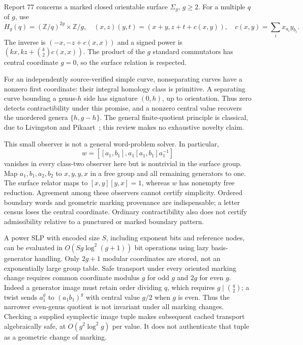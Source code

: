 Report 77 concerns a marked closed orientable surface $\Sigma_g$, $g\ge2$.
For a multiple $q$ of $g$, use
\[
 H_g(q)=(\mathbb Z/q)^{2g}\times\mathbb Z/g,\quad
 (x,z)(y,t)=(x+y,z+t+c(x,y)),\quad
 c(x,y)=\sum_i x_{a_i}y_{b_i}.
\]
The inverse is $(-x,-z+c(x,x))$ and a signed power is
$(kx,kz+\binom{k}{2}c(x,x))$. The product of the $g$ standard commutators
has central coordinate $g=0$, so the surface relation is respected.

For an independently source-verified simple curve, nonseparating curves
have a nonzero first coordinate: their integral homology class is primitive.
A separating curve bounding a genus-$h$ side has signature $(0,h)$, up to
orientation. Thus zero detects contractibility under this promise, and a
nonzero central value recovers the unordered genera $\{h,g-h\}$.
The general finite-quotient principle is classical, due to
Livingston and Pikaart~\cite{livingston-boundary,pikaart-boundary}; this review makes no exhaustive novelty claim.

This small observer is not a general word-problem solver. In particular,
\[
 w=[[a_1,b_1],a_1[a_1,b_1]a_1^{-1}]
\]
vanishes in every class-two observer here but is nontrivial in the surface
group. Map $a_1,b_1,a_2,b_2$ to $x,y,y,x$ in a free group and all remaining
generators to one. The surface relator maps to
$[x,y][y,x]=1$, whereas $w$ has nonempty free reduction.
Agreement among these observers cannot certify simplicity. Ordered boundary
words and geometric marking provenance are indispensable; a letter census
loses the central coordinate. Ordinary contractibility also does not certify
admissibility relative to a punctured or marked boundary pattern.

A power SLP with encoded size $S$, including exponent bits and reference
nodes, can be evaluated in $O(Sg\log^2(g+1))$ bit operations using lazy
basis-generator handling. Only $2g+1$ modular coordinates are stored, not
an exponentially large group table. Safe transport under every oriented
marking change requires common coordinate modulus $g$ for odd $g$ and
$2g$ for even $g$. Indeed a generator image must retain order dividing $q$,
which requires $g\mid\binom q2$; a twist sends $a_1^g$ to $(a_1b_1)^g$
with central value $g/2$ when $g$ is even. Thus the narrower even-genus
quotient is not invariant under all marking changes. Checking a supplied
symplectic image tuple makes subsequent cached transport algebraically safe,
at $O(g^2\log^2 g)$ per value. It does not authenticate that tuple as a
geometric change of marking.

